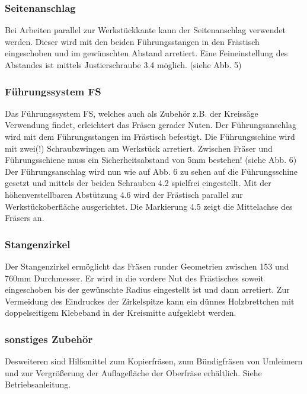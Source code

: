 \documentclass{\basedir/fablab-document}
\begin{document}
\subsubsection{Seitenanschlag}
Bei Arbeiten parallel zur Werkstückkante kann der Seitenanschlag verwendet werden. Dieser wird mit den beiden Führungsstangen in den Frästisch eingeschoben und im gewünschten Abstand arretiert.
Eine Feineinstellung des Abstandes ist mittels Justierschraube 3.4 möglich. (siehe Abb. 5)

\subsubsection{Führungssystem FS}
Das Führungssystem FS, welches auch als Zubehör z.B. der Kreissäge Verwendung findet, erleichtert das Fräsen gerader Nuten.
Der Führungsanschlag wird mit dem Führungsstangen im Frästisch befestigt. Die Führungsschine wird mit zwei(!) Schraubzwingen am Werkstück arretiert. Zwischen Fräser und Führungsschiene muss ein Sicherheitsabstand von 5mm bestehen! (siehe Abb. 6)
Der Führungsanschlag wird nun wie auf Abb. 6 zu sehen auf die Führungsschine gesetzt und mittels der beiden Schrauben 4.2 spielfrei eingestellt. Mit der höhenverstellbaren Abstützung 4.6 wird der Frästisch parallel zur Werkstückoberfläche ausgerichtet. Die Markierung 4.5 zeigt die Mittelachse des Fräsers an.

\subsubsection{Stangenzirkel}
Der Stangenzirkel ermöglicht das Fräsen runder Geometrien zwischen 153 und 760mm Durchmesser. Er wird in die vordere Nut des Frästisches soweit eingeschoben bis der gewünschte Radius eingestellt ist und dann arretiert. Zur Vermeidung des Eindruckes der Zirkelspitze kann ein dünnes Holzbrettchen mit doppelseitigem Klebeband in der Kreismitte aufgeklebt werden.

\subsubsection{sonstiges Zubehör}
Desweiteren sind Hilfsmittel zum Kopierfräsen, zum Bündigfräsen von Umleimern und zur Vergrößerung der Auflagefläche der Oberfräse erhältlich. Siehe Betriebsanleitung.
\end{document}
